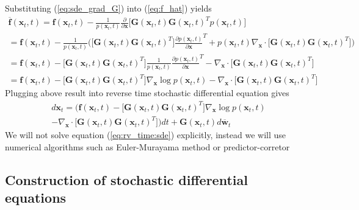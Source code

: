\documentclass[10pt]{article}
\begin{document}
Substituting (\ref{eq:sde_grad_G}) into (\ref{eq:f_hat}) yields
\begin{gather}
   \overline{\textbf{f}}(\textbf{x}_t , t) 
     =\textbf{f}(\textbf{x}_t , t) - \frac{1}{p(\textbf{x}_t , t)}\frac{\partial}{\partial \textbf{x}} \Big[ \textbf{G}(\textbf{x}_t, t) \textbf{G}(\textbf{x}_t, t) ^T p(\textbf{x}_t , t) \Big] \\
     =  \textbf{f}(\textbf{x}_t , t) - \frac{1}{p(\textbf{x}_t , t)} \Big( \Big[ \textbf{G}(\textbf{x}_t, t) \textbf{G}(\textbf{x}_t, t) ^T \Big]
    \frac{\partial p(\textbf{x}_t , t)}{\partial \textbf{x}} ^T 
    +
    p(\textbf{x}_t , t) \nabla_{\textbf{x}} \cdot  \Big[ \textbf{G}(\textbf{x}_t, t) \textbf{G}(\textbf{x}_t, t) ^T \Big] \Big)\\
    = \textbf{f}(\textbf{x}_t , t) - \Big[ \textbf{G}(\textbf{x}_t, t) \textbf{G}(\textbf{x}_t, t) ^T \Big]
    \frac{1}{p(\textbf{x}_t , t)} 
    \frac{\partial p(\textbf{x}_t , t)}{\partial \textbf{x}} ^T 
    - \nabla_{\textbf{x}} \cdot  \Big[ \textbf{G}(\textbf{x}_t, t) \textbf{G}(\textbf{x}_t, t) ^T \Big] \\
    = \textbf{f}(\textbf{x}_t , t) - \Big[ \textbf{G}(\textbf{x}_t, t) \textbf{G}(\textbf{x}_t, t) ^T \Big] 
    \nabla_{\textbf{x}} \log p(\textbf{x}_t , t)
    - \nabla_{\textbf{x}} \cdot  \Big[ \textbf{G}(\textbf{x}_t, t) \textbf{G}(\textbf{x}_t, t) ^T \Big] 
\end{gather}
Plugging above result into reverse time stochastic differential equation gives
\begin{equation}
\label{eq:rv_time:sde}
\begin{gathered}
     d \textbf{x}_t = \Big(
     \textbf{f}(\textbf{x}_t , t) - \Big[ \textbf{G}(\textbf{x}_t, t) \textbf{G}(\textbf{x}_t, t) ^T \Big] 
    \nabla_{\textbf{x}} \log p(\textbf{x}_t , t)\\
    - \nabla_{\textbf{x}} \cdot  \Big[ \textbf{G}(\textbf{x}_t, t) \textbf{G}(\textbf{x}_t, t) ^T \Big] \Big) dt + \textbf{G} (\textbf{x}_t , t)
        d \overline{\textbf{w}} _t
\end{gathered}
\end{equation}
We will not solve equation (\ref{eq:rv_time:sde}) explicitly, instead we will use numerical algorithms such as Euler-Murayama method or predictor-corretor
\subsection{Construction of stochastic differential equations}
\end{document}
